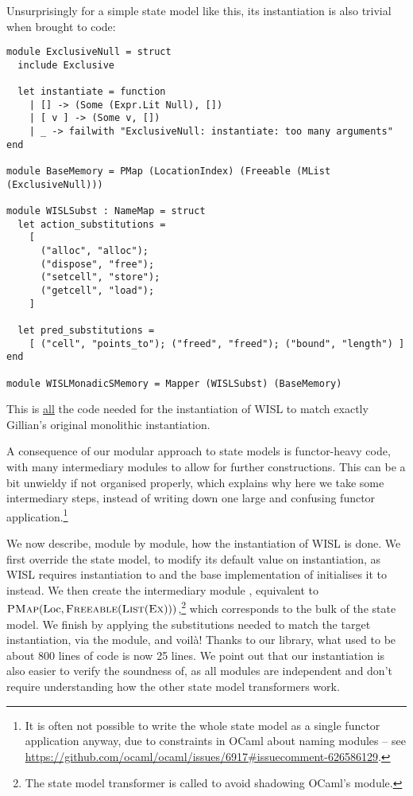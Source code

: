 Unsurprisingly for a simple state model like this, its instantiation is also trivial when brought to code: \begin{lstlisting}
module ExclusiveNull = struct
  include Exclusive

  let instantiate = function
    | [] -> (Some (Expr.Lit Null), [])
    | [ v ] -> (Some v, [])
    | _ -> failwith "ExclusiveNull: instantiate: too many arguments"
end

module BaseMemory = PMap (LocationIndex) (Freeable (MList (ExclusiveNull)))

module WISLSubst : NameMap = struct
  let action_substitutions =
    [
      ("alloc", "alloc");
      ("dispose", "free");
      ("setcell", "store");
      ("getcell", "load");
    ]

  let pred_substitutions =
    [ ("cell", "points_to"); ("freed", "freed"); ("bound", "length") ]
end

module WISLMonadicSMemory = Mapper (WISLSubst) (BaseMemory)
\end{lstlisting}
This is \underline{all} the code needed for the instantiation of WISL to match exactly Gillian's original monolithic instantiation.

A consequence of our modular approach to state models is functor-heavy code, with many intermediary modules to allow for further constructions. This can be a bit unwieldy if not organised properly, which explains why here we take some intermediary steps, instead of writing down one large and confusing functor application.\footnote{It is often not possible to write the whole state model as a single functor application anyway, due to constraints in OCaml about naming modules -- see \url{https://github.com/ocaml/ocaml/issues/6917\#issuecomment-626586129}.}

We now describe, module by module, how the instantiation of WISL is done. We first override the \Ex{} state model, to modify its default value on instantiation, as WISL requires instantiation to  and the base implementation of \Ex{} initialises it to  instead. We then create the intermediary module , equivalent to $\textsc{PMap}(\text{Loc},\textsc{Freeable}(\textsc{List}(\textsc{Ex})))$,\footnote{The \List{} state model transformer is called  to avoid shadowing OCaml's  module.} which corresponds to the bulk of the state model. We finish by applying the substitutions needed to match the target instantiation, via the  module, and voilà! Thanks to our library, what used to be about 800 lines of code is now 25 lines. We point out that our instantiation is also easier to verify the soundness of, as all modules are independent and don't require understanding how the other state model transformers work.

